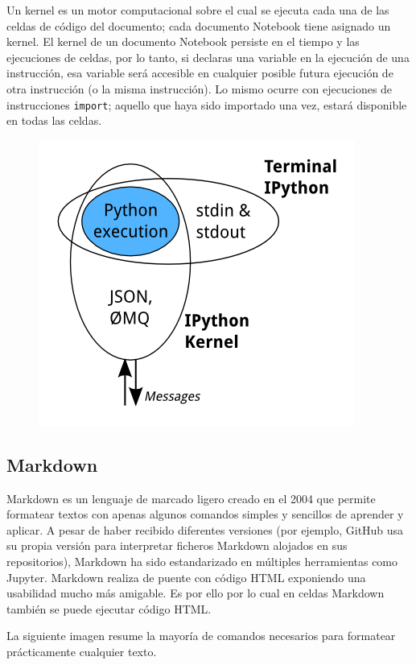 \documentclass[11pt]{article}
\makeatletter
\def\maxwidth{\ifdim\Gin@nat@width>\linewidth\linewidth
    \else\Gin@nat@width\fi}
\let\Oldincludegraphics\includegraphics
\renewcommand{\includegraphics}[1]{\Oldincludegraphics[width=.8\maxwidth]{#1}}
\makeatother
\begin{document}
    Un kernel es un motor computacional sobre el cual se ejecuta cada una de
las celdas de código del documento; cada documento Notebook tiene
asignado un kernel. El kernel de un documento Notebook persiste en el
tiempo y las ejecuciones de celdas, por lo tanto, si declaras una
variable en la ejecución de una instrucción, esa variable será accesible
en cualquier posible futura ejecución de otra instrucción (o la misma
instrucción). Lo mismo ocurre con ejecuciones de instrucciones
\texttt{import}; aquello que haya sido importado una vez, estará
disponible en todas las celdas.

    \begin{figure}
\centering
\includegraphics{kernel-pipeline.png}
\caption{}
\end{figure}

    \subsection{Markdown}\label{markdown}

    Markdown es un lenguaje de marcado ligero creado en el 2004 que permite
formatear textos con apenas algunos comandos simples y sencillos de
aprender y aplicar. A pesar de haber recibido diferentes versiones (por
ejemplo, GitHub usa su propia versión para interpretar ficheros Markdown
alojados en sus repositorios), Markdown ha sido estandarizado en
múltiples herramientas como Jupyter. Markdown realiza de puente con
código HTML exponiendo una usabilidad mucho más amigable. Es por ello
por lo cual en celdas Markdown también se puede ejecutar código HTML.

La siguiente imagen resume la mayoría de comandos necesarios para
formatear prácticamente cualquier texto.
\end{document}
